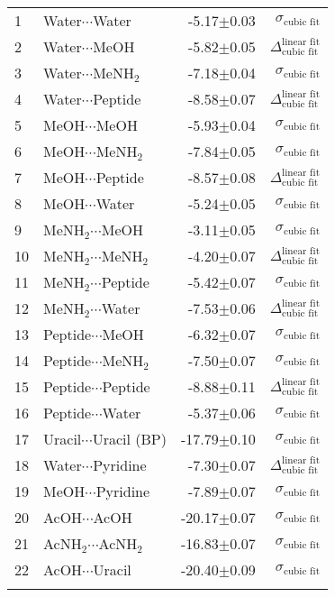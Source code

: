 \begin{longtable}{llrr}
1 & Water$\cdots$Water & -5.17$\pm$0.03 & $\sigma_\text{cubic fit}$ \\
2 & Water$\cdots$MeOH & -5.82$\pm$0.05 & $\Delta_\text{cubic fit}^\text{linear fit}$ \\
3 & Water$\cdots$MeNH$_2$ & -7.18$\pm$0.04 & $\sigma_\text{cubic fit}$ \\
4 & Water$\cdots$Peptide & -8.58$\pm$0.07 & $\Delta_\text{cubic fit}^\text{linear fit}$ \\
5 & MeOH$\cdots$MeOH & -5.93$\pm$0.04 & $\sigma_\text{cubic fit}$ \\
6 & MeOH$\cdots$MeNH$_2$ & -7.84$\pm$0.05 & $\sigma_\text{cubic fit}$ \\
7 & MeOH$\cdots$Peptide & -8.57$\pm$0.08 & $\Delta_\text{cubic fit}^\text{linear fit}$ \\
8 & MeOH$\cdots$Water & -5.24$\pm$0.05 & $\sigma_\text{cubic fit}$ \\
9 & MeNH$_2$$\cdots$MeOH & -3.11$\pm$0.05 & $\sigma_\text{cubic fit}$ \\
10 & MeNH$_2$$\cdots$MeNH$_2$ & -4.20$\pm$0.07 & $\Delta_\text{cubic fit}^\text{linear fit}$ \\
11 & MeNH$_2$$\cdots$Peptide & -5.42$\pm$0.07 & $\sigma_\text{cubic fit}$ \\
12 & MeNH$_2$$\cdots$Water & -7.53$\pm$0.06 & $\Delta_\text{cubic fit}^\text{linear fit}$ \\
13 & Peptide$\cdots$MeOH & -6.32$\pm$0.07 & $\sigma_\text{cubic fit}$ \\
14 & Peptide$\cdots$MeNH$_2$ & -7.50$\pm$0.07 & $\sigma_\text{cubic fit}$ \\
15 & Peptide$\cdots$Peptide & -8.88$\pm$0.11 & $\Delta_\text{cubic fit}^\text{linear fit}$ \\
16 & Peptide$\cdots$Water & -5.37$\pm$0.06 & $\sigma_\text{cubic fit}$ \\
17 & Uracil$\cdots$Uracil (BP) & -17.79$\pm$0.10 & $\sigma_\text{cubic fit}$ \\
18 & Water$\cdots$Pyridine & -7.30$\pm$0.07 & $\Delta_\text{cubic fit}^\text{linear fit}$ \\
19 & MeOH$\cdots$Pyridine & -7.89$\pm$0.07 & $\sigma_\text{cubic fit}$ \\
20 & AcOH$\cdots$AcOH & -20.17$\pm$0.07 & $\sigma_\text{cubic fit}$ \\
21 & AcNH$_2$$\cdots$AcNH$_2$ & -16.83$\pm$0.07 & $\sigma_\text{cubic fit}$ \\
22 & AcOH$\cdots$Uracil & -20.40$\pm$0.09 & $\sigma_\text{cubic fit}$ \\
$$
\end{longtable}
